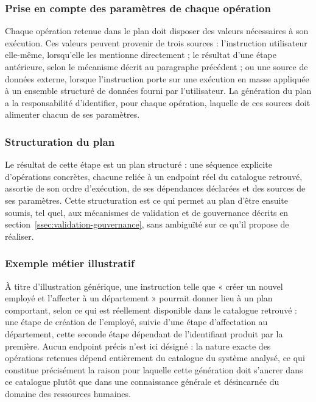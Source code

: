 \subsubsection{Prise en compte des paramètres de chaque opération}

Chaque opération retenue dans le plan doit disposer des valeurs nécessaires à son exécution. Ces valeurs peuvent provenir de trois sources : l'instruction utilisateur elle-même, lorsqu'elle les mentionne directement ; le résultat d'une étape antérieure, selon le mécanisme décrit au paragraphe précédent ; ou une source de données externe, lorsque l'instruction porte sur une exécution en masse appliquée à un ensemble structuré de données fourni par l'utilisateur. La génération du plan a la responsabilité d'identifier, pour chaque opération, laquelle de ces sources doit alimenter chacun de ses paramètres.

\subsubsection{Structuration du plan}

Le résultat de cette étape est un plan structuré : une séquence explicite d'opérations concrètes, chacune reliée à un endpoint réel du catalogue retrouvé, assortie de son ordre d'exécution, de ses dépendances déclarées et des sources de ses paramètres. Cette structuration est ce qui permet au plan d'être ensuite soumis, tel quel, aux mécanismes de validation et de gouvernance décrits en section~\ref{ssec:validation-gouvernance}, sans ambiguïté sur ce qu'il propose de réaliser.

\subsubsection{Exemple métier illustratif}

À titre d'illustration générique, une instruction telle que « créer un nouvel employé et l'affecter à un département » pourrait donner lieu à un plan comportant, selon ce qui est réellement disponible dans le catalogue retrouvé : une étape de création de l'employé, suivie d'une étape d'affectation au département, cette seconde étape dépendant de l'identifiant produit par la première. Aucun endpoint précis n'est ici désigné : la nature exacte des opérations retenues dépend entièrement du catalogue du système analysé, ce qui constitue précisément la raison pour laquelle cette génération doit s'ancrer dans ce catalogue plutôt que dans une connaissance générale et désincarnée du domaine des ressources humaines.

